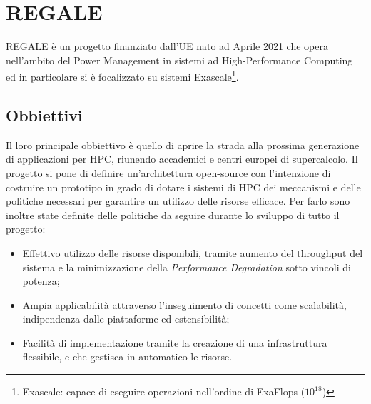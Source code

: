 \chapter{REGALE}\label{chap:4_REGALE}
REGALE\cite{REGALE} è un progetto finanziato dall'UE\cite{ue_REGALE} nato ad Aprile 2021 che opera nell'ambito del Power Management in sistemi ad High-Performance Computing ed in particolare si è focalizzato su sistemi Exascale\footnote{Exascale: capace di eseguire operazioni nell'ordine di ExaFlops ($10^{18}$)}.

\section{Obbiettivi}
Il loro principale obbiettivo è quello di aprire la strada alla prossima generazione di applicazioni per HPC, riunendo accademici e centri europei di supercalcolo. Il progetto si pone di definire un'architettura open-source con l'intenzione di costruire un prototipo in grado di dotare i sistemi di HPC dei meccanismi e delle politiche necessari per garantire un utilizzo delle risorse efficace\cite{ue_REGALE}. Per farlo sono inoltre state definite delle politiche da seguire durante lo sviluppo di tutto il progetto:
\begin{itemize}
    \item Effettivo utilizzo delle risorse disponibili, tramite aumento del throughput del sistema e la minimizzazione della \emph{Performance Degradation} sotto vincoli di potenza;
    \item Ampia applicabilità attraverso l'inseguimento di concetti come scalabilità, indipendenza dalle piattaforme ed estensibilità;
    \item Facilità di implementazione tramite la creazione di una infrastruttura flessibile, e che gestisca in automatico le risorse.
\end{itemize}


